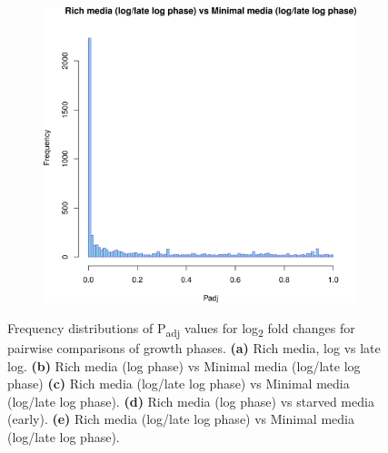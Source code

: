 \begin{figure}[H]
\begin{subfigure}{0.49\textwidth}
\includegraphics[width=0.9\linewidth]{psa/hist_richloglate_minimal.png}
\end{subfigure}
\begin{minipage}[c]{0.49\textwidth}
\caption[Frequency distributions of P\textsubscript{adj} values for log\textsubscript{2} fold changes for comparisons of growth phases]{Frequency distributions of P\textsubscript{adj} values for log\textsubscript{2} fold changes for pairwise comparisons of growth phases. \textbf{(a)} Rich media, log vs late log. \textbf{(b)} Rich media (log phase) vs Minimal media (log/late log phase) \textbf{(c)} Rich media (log/late log phase) vs Minimal media (log/late log phase). \textbf{(d)} Rich media (log phase) vs starved media (early). \textbf{(e)} Rich media (log/late log phase) vs Minimal media (log/late log phase).}
\label{fig:hist_growth}
  \end{minipage}
\end{figure}

